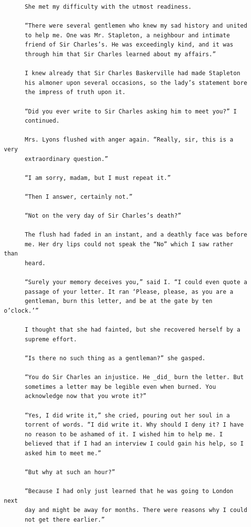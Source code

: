 \documentclass{article}
\begin{document}
\begin{verbatim}
      She met my difficulty with the utmost readiness.

      “There were several gentlemen who knew my sad history and united
      to help me. One was Mr. Stapleton, a neighbour and intimate
      friend of Sir Charles’s. He was exceedingly kind, and it was
      through him that Sir Charles learned about my affairs.”

      I knew already that Sir Charles Baskerville had made Stapleton
      his almoner upon several occasions, so the lady’s statement bore
      the impress of truth upon it.

      “Did you ever write to Sir Charles asking him to meet you?” I
      continued.

      Mrs. Lyons flushed with anger again. “Really, sir, this is a very
      extraordinary question.”

      “I am sorry, madam, but I must repeat it.”

      “Then I answer, certainly not.”

      “Not on the very day of Sir Charles’s death?”

      The flush had faded in an instant, and a deathly face was before
      me. Her dry lips could not speak the “No” which I saw rather than
      heard.

      “Surely your memory deceives you,” said I. “I could even quote a
      passage of your letter. It ran ‘Please, please, as you are a
      gentleman, burn this letter, and be at the gate by ten o’clock.’”

      I thought that she had fainted, but she recovered herself by a
      supreme effort.

      “Is there no such thing as a gentleman?” she gasped.

      “You do Sir Charles an injustice. He _did_ burn the letter. But
      sometimes a letter may be legible even when burned. You
      acknowledge now that you wrote it?”

      “Yes, I did write it,” she cried, pouring out her soul in a
      torrent of words. “I did write it. Why should I deny it? I have
      no reason to be ashamed of it. I wished him to help me. I
      believed that if I had an interview I could gain his help, so I
      asked him to meet me.”

      “But why at such an hour?”

      “Because I had only just learned that he was going to London next
      day and might be away for months. There were reasons why I could
      not get there earlier.”


\end{verbatim}
\end{document}
